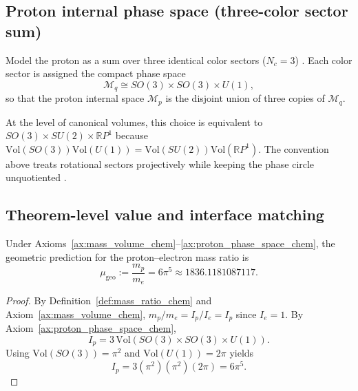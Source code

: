 \subsection{Proton internal phase space (three-color sector sum)}
\begin{axiom}\label{ax:proton_phase_space_chem}
Model the proton as a sum over three identical color sectors ($N_c=3$) \cite{PeskinSchroeder1995}. Each color sector is assigned the compact phase space
\begin{equation}
\mathcal{M}_{q}\cong SO(3)\times SO(3)\times U(1),
\end{equation}
so that the proton internal space $\mathcal{M}_p$ is the disjoint union of three copies of $\mathcal{M}_q$.
\end{axiom}
\begin{remark}
At the level of canonical volumes, this choice is equivalent to $SO(3)\times SU(2)\times \mathbb{R}P^1$ because $\mathrm{Vol}(SO(3))\mathrm{Vol}(U(1))=\mathrm{Vol}(SU(2))\mathrm{Vol}(\mathbb{R}P^1)$. The convention above treats rotational sectors projectively while keeping the phase circle unquotiented \cite{Ma2025PCG}.
\end{remark}

\subsection{Theorem-level value and interface matching}
\begin{theorem}\label{thm:mu_geo_chem}
Under Axioms~\ref{ax:mass_volume_chem}--\ref{ax:proton_phase_space_chem}, the geometric prediction for the proton--electron mass ratio is
\begin{equation}
\mu_{\mathrm{geo}}:=\frac{m_p}{m_e}=6\pi^5\approx 1836.1181087117.
\end{equation}
\end{theorem}
\begin{proof}
By Definition~\ref{def:mass_ratio_chem} and Axiom~\ref{ax:mass_volume_chem}, $m_p/m_e=I_p/I_e=I_p$ since $I_e=1$. By Axiom~\ref{ax:proton_phase_space_chem},
\begin{equation}
I_p=3\,\mathrm{Vol}(SO(3)\times SO(3)\times U(1)).
\end{equation}
Using $\mathrm{Vol}(SO(3))=\pi^2$ and $\mathrm{Vol}(U(1))=2\pi$ yields
\begin{equation}
I_p=3(\pi^2)(\pi^2)(2\pi)=6\pi^5.
\end{equation}
\end{proof}

